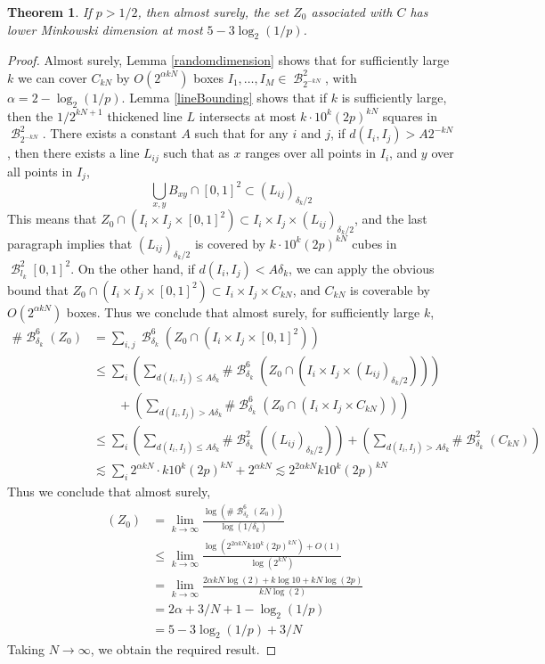 \documentclass[dvipsnames,letterpaper,12pt]{article}
\numberwithin{equation}{section}
\theoremstyle{plain}
\newtheorem{theorem}{Theorem}
\theoremstyle{remark}
\DeclareMathOperator{\minkdim}{\dim_{\mathbf{M}}}
\DeclareMathOperator{\B}{\mathcal{B}}
\begin{document}
\begin{theorem}
	If $p > 1/2$, then almost surely, the set $Z_0$ associated with $C$ has lower Minkowski dimension at most $5 - 3 \log_2(1/p)$.
\end{theorem}
\begin{proof}
	Almost surely, Lemma \ref{randomdimension} shows that for sufficiently large $k$ we can cover $C_{kN}$ by $O(2^{\alpha kN})$ boxes $I_1, \dots, I_M \in \B^2_{2^{-kN}}$, with $\alpha = 2 - \log_2(1/p)$. Lemma \ref{lineBounding} shows that if $k$ is sufficiently large, then the $1/2^{kN+1}$ thickened line $L$ intersects at most $k \cdot 10^k (2p)^{kN}$ squares in $\B^2_{2^{-kN}}$. There exists a constant $A$ such that for any $i$ and $j$, if $d(I_i, I_j) > A 2^{-kN}$, then there exists a line $L_{ij}$ such that as $x$ ranges over all points in $I_i$, and $y$ over all points in $I_j$,
	\[ \bigcup_{x,y} B_{xy} \cap [0,1]^2 \subset (L_{ij})_{\delta_k/2} \]
	This means that $Z_0 \cap (I_i \times I_j \times [0,1]^2) \subset I_i \times I_j \times (L_{ij})_{\delta_k/2}$, and the last paragraph implies that $(L_{ij})_{\delta_k/2}$ is covered by $k \cdot 10^k (2p)^{kN}$ cubes in $\B^2_{l_k}[0,1]^2$. On the other hand, if $d(I_i,I_j) < A \delta_k$, we can apply the obvious bound that $Z_0 \cap (I_i \times I_j \times [0,1]^2) \subset I_i \times I_j \times C_{kN}$, and $C_{kN}$ is coverable by $O(2^{\alpha kN})$ boxes. Thus we conclude that almost surely, for sufficiently large $k$,
	\begin{align*}
		\# \B^6_{\delta_k}(Z_0) &= \sum_{i,j} \B^6_{\delta_k}(Z_0 \cap (I_i \times I_j \times [0,1]^2)) \\
		&\leq \sum_i \left( \sum_{d(I_i,I_j) \leq A \delta_k} \# \B^6_{\delta_k}(Z_0 \cap (I_i \times I_j \times (L_{ij})_{\delta_k/2})) \right)\\
		&\quad\quad+ \left( \sum_{d(I_i,I_j) > A \delta_k} \# \B^6_{\delta_k}(Z_0 \cap (I_i \times I_j \times C_{kN})) \right)\\
		&\leq \sum_i \left( \sum_{d(I_i,I_j) \leq A \delta_k} \# \B^2_{\delta_k}((L_{ij})_{\delta_k/2}) \right) + \left( \sum_{d(I_i,I_j) > A \delta_k} \# \B^2_{\delta_k}(C_{kN}) \right)\\
		&\lesssim \sum_i 2^{\alpha kN} \cdot k 10^k (2p)^{kN} + 2^{\alpha kN} \lesssim 2^{2\alpha kN} k 10^k (2p)^{kN}
	\end{align*}
	Thus we conclude that almost surely,
	\begin{align*}
		\minkdim(Z_0) &= \lim_{k \to \infty} \frac{\log \left( \# \B^6_{\delta_k}(Z_0) \right)}{\log(1/\delta_k)}\\
		&\leq \lim_{k \to \infty} \frac{\log(2^{2 \alpha kN} k 10^k (2p)^{kN}) + O(1)}{\log(2^{kN})}\\
		&= \lim_{k \to \infty} \frac{2 \alpha k N \log(2) + k \log 10 + kN \log(2p)}{kN \log(2)}\\
		&= 2 \alpha + 3/N + 1 - \log_2(1/p)\\
		&= 5 - 3\log_2(1/p) + 3/N
	\end{align*}
	Taking $N \to \infty$, we obtain the required result.
\end{proof}
\end{document}
